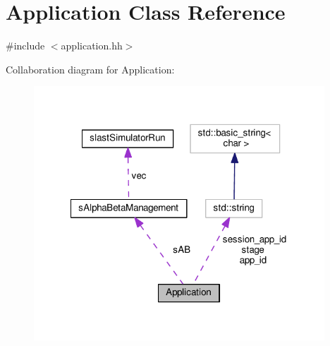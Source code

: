 \hypertarget{classApplication}{\section{Application Class Reference}
\label{classApplication}
}


{\ttfamily \#include $<$application.\-hh$>$}



Collaboration diagram for Application\-:\nopagebreak
\begin{figure}[H]
\begin{center}
\leavevmode
\includegraphics[width=309pt]{classApplication__coll__graph}
\end{center}
\end{figure}
